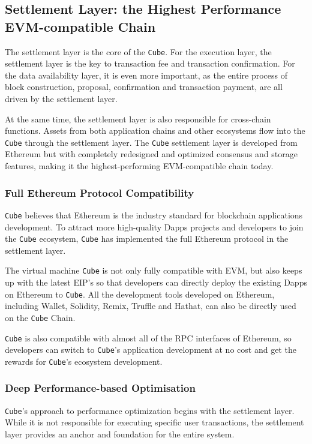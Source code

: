 \documentclass{iacrtrans}
\begin{document}
\subsection{Settlement Layer: the Highest Performance EVM-compatible Chain}
The settlement layer is the core of the \texttt{Cube}. For the execution layer, the settlement layer is the key to transaction fee and transaction confirmation. For the data availability layer, it is even more important, as the entire process of block construction, proposal, confirmation and transaction payment, are all driven by the settlement layer. 

At the same time, the settlement layer is also responsible for cross-chain functions. Assets from both application chains and other ecosystems flow into the \texttt{Cube} through the settlement layer. The \texttt{Cube} settlement layer is developed from Ethereum but with completely redesigned and optimized consensus and storage features, making it the highest-performing EVM-compatible chain today.


\subsubsection{Full Ethereum Protocol Compatibility}
\texttt{Cube} believes that Ethereum is the industry standard for blockchain applications development. To attract more high-quality Dapps projects and developers to join the \texttt{Cube} ecosystem, \texttt{Cube} has implemented the full Ethereum protocol in the settlement layer. 

The virtual machine \texttt{Cube} is not only fully compatible with EVM, but also keeps up with the latest EIP's so that developers can directly deploy the existing Dapps on Ethereum to \texttt{Cube}. All the development tools developed on Ethereum, including Wallet, Solidity, Remix, Truffle and Hathat, can also be directly used on the \texttt{Cube} Chain.

\texttt{Cube} is also compatible with almost all of the RPC interfaces of Ethereum, so developers can switch to \texttt{Cube}'s application development at no cost and get the rewards for \texttt{Cube}'s ecosystem development.


\subsubsection{Deep Performance-based Optimisation}
\texttt{Cube}'s approach to performance optimization begins with the settlement layer. While it is not responsible for executing specific user transactions, the settlement layer provides an anchor and foundation for the entire system. 
\end{document}

